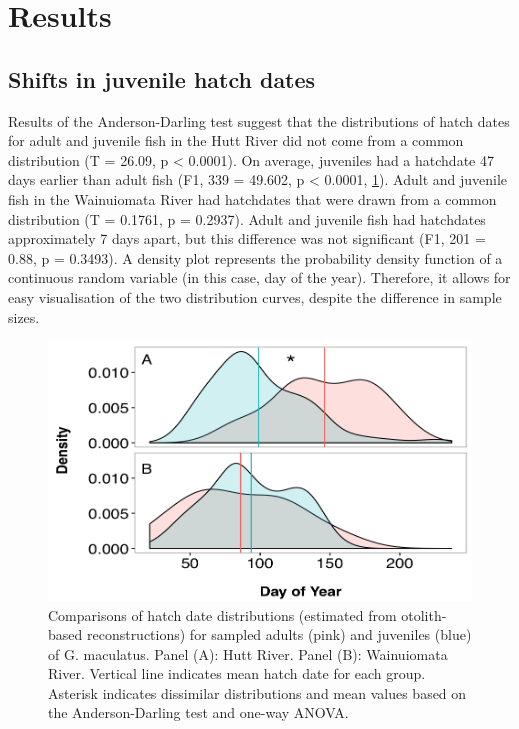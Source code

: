 \documentclass[]{book}
\begin{document}
\section{Results}\label{results-2}

\subsection{Shifts in juvenile hatch
dates}\label{shifts-in-juvenile-hatch-dates}

Results of the Anderson-Darling test suggest that the distributions of
hatch dates for adult and juvenile fish in the Hutt River did not come
from a common distribution (T = 26.09, p \textless{} 0.0001). On
average, juveniles had a hatchdate 47 days earlier than adult fish (F1,
339 = 49.602, p \textless{} 0.0001, \ref{fig:hatch-distributions}).
Adult and juvenile fish in the Wainuiomata River had hatchdates that
were drawn from a common distribution (T = 0.1761, p = 0.2937). Adult
and juvenile fish had hatchdates approximately 7 days apart, but this
difference was not significant (F1, 201 = 0.88, p = 0.3493). A density
plot represents the probability density function of a continuous random
variable (in this case, day of the year). Therefore, it allows for easy
visualisation of the two distribution curves, despite the difference in
sample sizes.

\begin{figure}
\centering
\includegraphics{images/data-chapter-3/hatch-distributions.png}
\caption{\label{fig:hatch-distributions}Comparisons of hatch date
distributions (estimated from otolith-based reconstructions) for sampled
adults (pink) and juveniles (blue) of G. maculatus. Panel (A): Hutt
River. Panel (B): Wainuiomata River. Vertical line indicates mean hatch
date for each group. Asterisk indicates dissimilar distributions and
mean values based on the Anderson-Darling test and one-way ANOVA.}
\end{figure}
\end{document}

